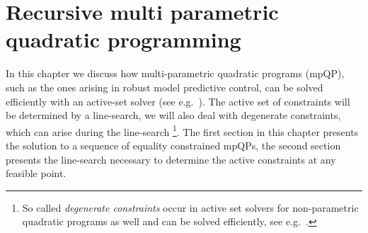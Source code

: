 
\chapter{Recursive multi parametric quadratic programming}\label{app:chp:mpqp}

In this chapter we discuss how multi-parametric quadratic programs (mpQP), such as the ones arising in
robust model predictive control, can be solved efficiently with an active-set solver (see 
e.g.~\cite{Fletcher:1987}).
%
The active set of constraints will be determined by a line-search, we will also deal with degenerate
constraints, which can arise during the line-search
%
\footnote{So called \emph{degenerate constraints} occur in active set solvers for non-parametric quadratic programs 
as well and can be solved efficiently, see e.g.~\cite{fletcher:1993}.
}.
%
The first section in this chapter presents the solution to a sequence of equality constrained mpQPs, the second 
section presents the line-search necessary to determine the active constraints at any feasible point.
%
